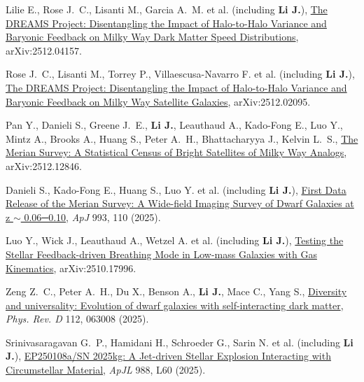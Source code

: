\item Lilie E., Rose J.~C., Lisanti M., Garcia A.~M. et al. (including \textbf{Li J.}), \href{https://ui.adsabs.harvard.edu/abs/2025arXiv251204157L}{The DREAMS Project: Disentangling the Impact of Halo-to-Halo Variance and Baryonic Feedback on Milky Way Dark Matter Speed Distributions}, arXiv:2512.04157.

\item Rose J.~C., Lisanti M., Torrey P., Villaescusa-Navarro F. et al. (including \textbf{Li J.}), \href{https://ui.adsabs.harvard.edu/abs/2025arXiv251202095R}{The DREAMS Project: Disentangling the Impact of Halo-to-Halo Variance and Baryonic Feedback on Milky Way Satellite Galaxies}, arXiv:2512.02095.

\item Pan Y., Danieli S., Greene J.~E., \textbf{Li J.}, Leauthaud A., Kado-Fong E., Luo Y., Mintz A., Brooks A., Huang S., Peter A.~H., Bhattacharyya J., Kelvin L.~S., \href{https://ui.adsabs.harvard.edu/abs/2025arXiv251212846P}{The Merian Survey: A Statistical Census of Bright Satellites of Milky Way Analogs}, arXiv:2512.12846.

\item Danieli S., Kado-Fong E., Huang S., Luo Y. et al. (including \textbf{Li J.}), \href{https://ui.adsabs.harvard.edu/abs/2025ApJ...993..110D}{First Data Release of the Merian Survey: A Wide-field Imaging Survey of Dwarf Galaxies at z {\ensuremath{\sim}} 0.06─0.10}, \textit{ApJ} 993, 110 (2025).

\item Luo Y., Wick J., Leauthaud A., Wetzel A. et al. (including \textbf{Li J.}), \href{https://ui.adsabs.harvard.edu/abs/2025arXiv251017996L}{Testing the Stellar Feedback-driven Breathing Mode in Low-mass Galaxies with Gas Kinematics}, arXiv:2510.17996.

\item Zeng Z.~C., Peter A.~H., Du X., Benson A., \textbf{Li J.}, Mace C., Yang S., \href{https://ui.adsabs.harvard.edu/abs/2025PhRvD.112f3008Z}{Diversity and universality: Evolution of dwarf galaxies with self-interacting dark matter}, \textit{Phys. Rev. D} 112, 063008 (2025).

\item Srinivasaragavan G.~P., Hamidani H., Schroeder G., Sarin N. et al. (including \textbf{Li J.}), \href{https://ui.adsabs.harvard.edu/abs/2025ApJ...988L..60S}{EP250108a/SN 2025kg: A Jet-driven Stellar Explosion Interacting with Circumstellar Material}, \textit{ApJL} 988, L60 (2025).

